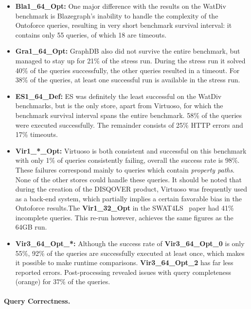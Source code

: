 \begin{itemize}
	\item \textbf{Bla1\_64\_Opt:} One major difference with the results on the WatDiv benchmark is Blazegraph's inability to handle the complexity of the Ontoforce queries, resulting in very short benchmark survival interval: it contains only 55 queries, of which 18 are timeouts.
	
	\item \textbf{Gra1\_64\_Opt:} GraphDB also did not survive the entire benchmark, but managed to stay up for 21\% of the stress run. During the stress run it solved 40\% of the queries successfully, the other queries resulted in a timeout. For 38\% of the queries, at least one successful run is available in the stress run.

	\item \textbf{ES1\_64\_Def:} ES was definitely the least successful on the WatDiv benchmarks, but is the only store, apart from Virtuoso, for which the benchmark survival interval spans the entire benchmark. 58\% of the queries were executed successfully. The remainder consists of 25\% HTTP errors and 17\% timeouts. 
	\item \textbf{Vir1\_*\_Opt:} Virtuoso is both consistent and successful on this benchmark with only 1\% of queries consistently failing, overall the success rate is 98\%. These failures correspond mainly to queries which contain \emph{property paths}. None of the other stores could handle these queries. 
	It should be noted that during the creation of the DISQOVER product, Virtuoso was frequently used as a back-end system, which partially implies a certain favorable bias in the Ontoforce results.The \textbf{Vir1\_32\_Opt} in the SWAT4LS~\cite{dewitte_swat4ls_2016} paper had 41\% incomplete queries. This re-run however, achieves the same figures as the 64GB run.
	
	\item \textbf{Vir3\_64\_Opt\_*:} Although the success rate of \textbf{Vir3\_64\_Opt\_0} is only 55\%, 92\% of the queries are successfully executed at least once, which makes it possible to make runtime comparisons. \textbf{Vir3\_64\_Opt\_2} has far less reported errors. Post-processing revealed issues with query completeness (orange) for 37\% of the queries.
\end{itemize}


 
\paragraph{Query Correctness.}

